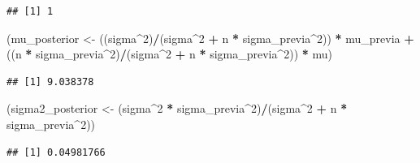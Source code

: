 \documentclass[
  12pt,
]{book}
\newenvironment{Shaded}{\begin{snugshade}}{\end{snugshade}}
\newcommand{\DecValTok}[1]{\textcolor[rgb]{0.00,0.00,0.81}{#1}}
\newcommand{\NormalTok}[1]{#1}
\newcommand{\OperatorTok}[1]{\textcolor[rgb]{0.81,0.36,0.00}{\textbf{#1}}}
\newcommand{\StringTok}[1]{\textcolor[rgb]{0.31,0.60,0.02}{#1}}
\begin{document}
\begin{verbatim}
## [1] 1
\end{verbatim}

\begin{Shaded}
\begin{Highlighting}[]
\NormalTok{(mu\_posterior \textless{}{-}}\StringTok{ }\NormalTok{((sigma}\OperatorTok{\^{}}\DecValTok{2}\NormalTok{)}\OperatorTok{/}\NormalTok{(sigma}\OperatorTok{\^{}}\DecValTok{2} \OperatorTok{+}\StringTok{ }\NormalTok{n }\OperatorTok{*}\StringTok{ }\NormalTok{sigma\_previa}\OperatorTok{\^{}}\DecValTok{2}\NormalTok{)) }\OperatorTok{*}\StringTok{ }
\StringTok{    }\NormalTok{mu\_previa }\OperatorTok{+}\StringTok{ }\NormalTok{((n }\OperatorTok{*}\StringTok{ }\NormalTok{sigma\_previa}\OperatorTok{\^{}}\DecValTok{2}\NormalTok{)}\OperatorTok{/}\NormalTok{(sigma}\OperatorTok{\^{}}\DecValTok{2} \OperatorTok{+}\StringTok{ }\NormalTok{n }\OperatorTok{*}\StringTok{ }
\StringTok{    }\NormalTok{sigma\_previa}\OperatorTok{\^{}}\DecValTok{2}\NormalTok{)) }\OperatorTok{*}\StringTok{ }\NormalTok{mu)}
\end{Highlighting}
\end{Shaded}

\begin{verbatim}
## [1] 9.038378
\end{verbatim}

\begin{Shaded}
\begin{Highlighting}[]
\NormalTok{(sigma2\_posterior \textless{}{-}}\StringTok{ }\NormalTok{(sigma}\OperatorTok{\^{}}\DecValTok{2} \OperatorTok{*}\StringTok{ }\NormalTok{sigma\_previa}\OperatorTok{\^{}}\DecValTok{2}\NormalTok{)}\OperatorTok{/}\NormalTok{(sigma}\OperatorTok{\^{}}\DecValTok{2} \OperatorTok{+}\StringTok{ }
\StringTok{    }\NormalTok{n }\OperatorTok{*}\StringTok{ }\NormalTok{sigma\_previa}\OperatorTok{\^{}}\DecValTok{2}\NormalTok{))}
\end{Highlighting}
\end{Shaded}

\begin{verbatim}
## [1] 0.04981766
\end{verbatim}
\end{document}
